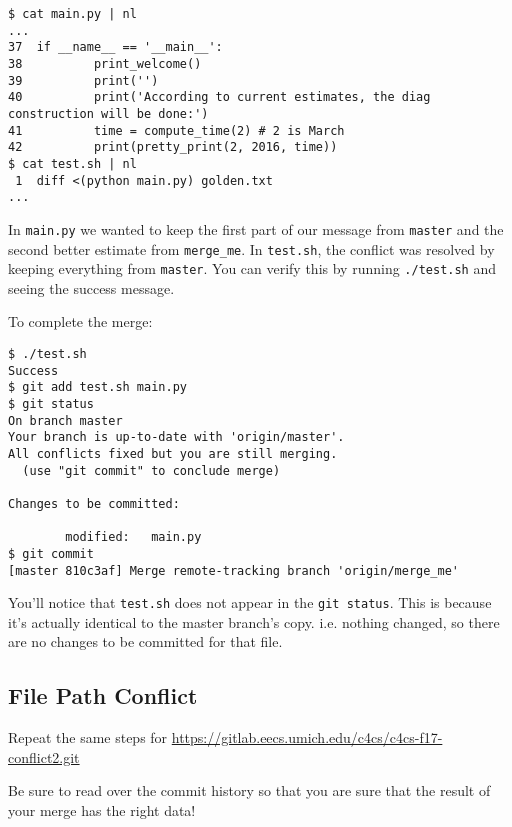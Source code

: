 \documentclass{article}
\begin{document}
{    \begin{verbatim}
$ cat main.py | nl
...
37  if __name__ == '__main__':
38          print_welcome()
39          print('')
40          print('According to current estimates, the diag construction will be done:')
41          time = compute_time(2) # 2 is March
42          print(pretty_print(2, 2016, time))
$ cat test.sh | nl
 1  diff <(python main.py) golden.txt
...
    \end{verbatim}

    In \texttt{main.py} we wanted to keep the first part of our message from
    \texttt{master} and the second better estimate from \texttt{merge\_me}. In
    \texttt{test.sh}, the conflict was resolved by keeping everything from
    \texttt{master}. You can verify this by running \texttt{./test.sh} and
    seeing the success message.

    To complete the merge:

    \begin{verbatim}
$ ./test.sh
Success
$ git add test.sh main.py
$ git status
On branch master
Your branch is up-to-date with 'origin/master'.
All conflicts fixed but you are still merging.
  (use "git commit" to conclude merge)

Changes to be committed:

        modified:   main.py
$ git commit
[master 810c3af] Merge remote-tracking branch 'origin/merge_me'
    \end{verbatim}

    You'll notice that \texttt{test.sh} does not appear in the \texttt{git
    status}. This is because it's actually identical to the master branch's
    copy. i.e. nothing changed, so there are no changes to be committed for that
    file.
}

\newpage
\subsection{File Path Conflict}

Repeat the same steps for
\url{https://gitlab.eecs.umich.edu/c4cs/c4cs-f17-conflict2.git}

Be sure to read over the commit history so that you are sure that the result
of your merge has the right data!
\end{document}
